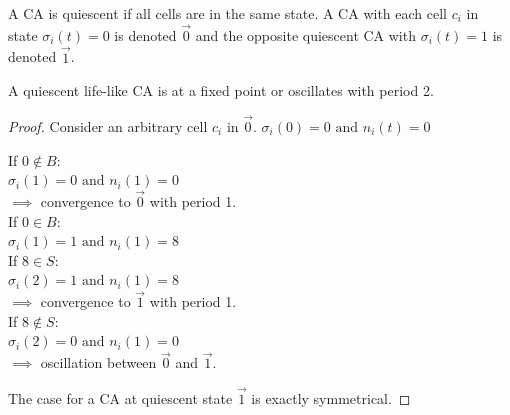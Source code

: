 \begin{definition}[Quiescence]
A CA is quiescent if all cells are in the same state. A CA with each cell $c_i$ in state $\sigma_i(t) = 0$ is denoted $\vec{0}$ and the opposite quiescent CA with $\sigma_i(t) = 1$ is denoted $\vec{1}$. 
\end{definition}

\begin{lemma}
A quiescent life-like CA is at a fixed point or oscillates with period 2.   
\end{lemma}

\begin{proof} \label{quiescent-nullity}
Consider an arbitrary cell $c_i$ in $\vec{0}$. $\sigma_i(0) = 0 \text{\ and\ } n_i(t) = 0$\\
\begin{multicols}{2}
\noindent If $0 \notin B$:\\
\null \quad $\sigma_i(1) = 0 \text{\ and\ } n_i(1) = 0 $\\
\null \quad $\implies$ convergence to $\vec{0}$ with period 1.\\
\columnbreak\linebreak
\noindent If $0 \in B$:\\
\null \quad $\sigma_i(1) = 1 \text{\ and\ } n_i(1) = 8 $\\
\null \quad If $8 \in S$:\\
\null \qquad $\sigma_i(2) = 1 \text{\ and\ } n_i(1) = 8 $\\
\null \qquad $\implies$ convergence to $\vec{1}$ with period 1.\\
\null \quad If $8 \notin S$:\\
\null \qquad $\sigma_i(2) = 0 \text{\ and\ } n_i(1) = 0 $\\
\null \qquad $\implies$ oscillation between $\vec{0}$ and $\vec{1}$.
\end{multicols}
\noindent The case for a CA at quiescent state $\vec{1}$ is exactly symmetrical.
\end{proof}

